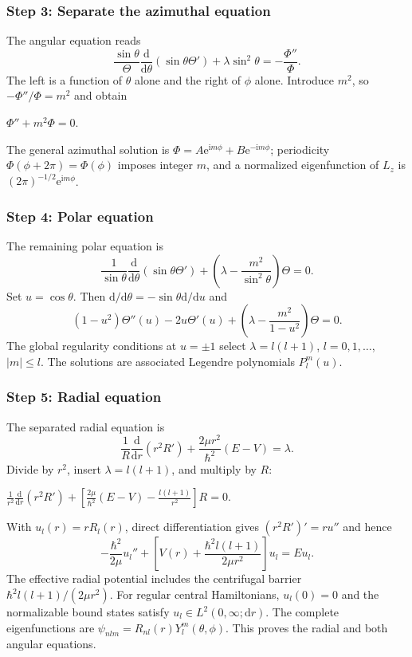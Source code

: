 \documentclass[11pt,a4paper]{article}
\newcommand{\key}[1]{\begin{resultbox}\centering\(\displaystyle #1\)\end{resultbox}}
\newcommand{\dd}{\mathrm{d}}
\newcommand{\iu}{\mathrm{i}}
\newcommand{\ee}{\mathrm{e}}
\begin{document}
\subsubsection*{Step 3: Separate the azimuthal equation}
The angular equation reads
\begin{equation}\frac{\sin\theta}{\Theta}\frac{\dd}{\dd\theta}(\sin\theta\Theta')+\lambda\sin^2\theta=-\frac{\Phi''}{\Phi}.\end{equation}
The left is a function of \(\theta\) alone and the right of \(\phi\) alone. Introduce \(m^2\), so \(-\Phi''/\Phi=m^2\) and obtain
\key{\boxed{\Phi''+m^2\Phi=0.}}
The general azimuthal solution is \(\Phi=A\ee^{\iu m\phi}+B\ee^{-\iu m\phi}\); periodicity \(\Phi(\phi+2\pi)=\Phi(\phi)\) imposes integer \(m\), and a normalized eigenfunction of \(L_z\) is \((2\pi)^{-1/2}\ee^{\iu m\phi}\).

\subsubsection*{Step 4: Polar equation}
The remaining polar equation is
\begin{equation}\frac1{\sin\theta}\frac{\dd}{\dd\theta}\left(\sin\theta\Theta'\right)+\left(\lambda-\frac{m^2}{\sin^2\theta}\right)\Theta=0.
\end{equation}
Set \(u=\cos\theta\). Then \(\dd/\dd\theta=-\sin\theta\dd/\dd u\) and
\begin{equation}\boxed{(1-u^2)\Theta''(u)-2u\Theta'(u)+\left(\lambda-\frac{m^2}{1-u^2}\right)\Theta=0.}\end{equation}
The global regularity conditions at \(u=\pm1\) select \(\lambda=l(l+1)\), \(l=0,1,\ldots\), \(|m|\le l\). The solutions are associated Legendre polynomials \(P_l^m(u)\).

\subsubsection*{Step 5: Radial equation}
The separated radial equation is
\begin{equation}\frac1R\frac{\dd}{\dd r}(r^2R')+\frac{2\mu r^2}{\hbar^2}(E-V)=\lambda.
\end{equation}
Divide by \(r^2\), insert \(\lambda=l(l+1)\), and multiply by \(R\):
\key{\boxed{\frac1{r^2}\frac{\dd}{\dd r}(r^2R')+\left[\frac{2\mu}{\hbar^2}(E-V)-\frac{l(l+1)}{r^2}\right]R=0.}}
With \(u_l(r)=rR_l(r)\), direct differentiation gives \((r^2R')'=ru''\) and hence
\begin{equation}\boxed{-\frac{\hbar^2}{2\mu}u_l''+\left[V(r)+\frac{\hbar^2l(l+1)}{2\mu r^2}\right]u_l=Eu_l.}\end{equation}
The effective radial potential includes the centrifugal barrier \(\hbar^2l(l+1)/(2\mu r^2)\). For regular central Hamiltonians, \(u_l(0)=0\) and the normalizable bound states satisfy \(u_l\in L^2(0,\infty;\dd r)\). The complete eigenfunctions are \(\psi_{nlm}=R_{nl}(r)Y_l^m(\theta,\phi)\). This proves the radial and both angular equations.
\end{document}
